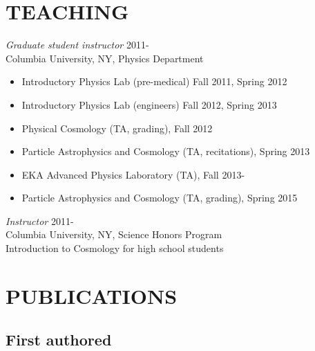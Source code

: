 \documentclass[margin]{res} %
\begin{document}
\begin{resume}
\section{TEACHING} 
{\sl Graduate student instructor} \hfill 2011-\\ 
Columbia University, NY, Physics Department 
\begin{itemize}
\item Introductory Physics Lab (pre-medical) Fall 2011, Spring 2012
\item Introductory Physics Lab (engineers) Fall 2012, Spring 2013
\item Physical Cosmology (TA, grading), Fall 2012
\item Particle Astrophysics and Cosmology (TA, recitations), Spring 2013 
\item EKA Advanced Physics Laboratory (TA), Fall 2013-
\item Particle Astrophysics and Cosmology (TA, grading), Spring 2015
\end{itemize}

{\sl Instructor} \hfill 2011- \\
Columbia University, NY, Science Honors Program\\
Introduction to Cosmology for high school students

\section{PUBLICATIONS}

\subsection{First authored}

\begin{enumerate}


\end{enumerate}
\end{resume}
\end{document}
